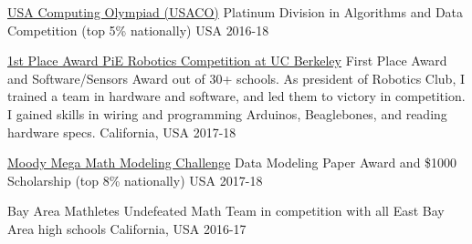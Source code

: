 



\begin{cvhonors}
  
  \cvhonor
		{\href{usaco.org}{USA Computing Olympiad (USACO)}} %
    {Platinum Division in Algorithms and Data Competition (top 5\% nationally)}
    {USA} %
    {2016-18} %
    
  \cvhonor
	{\href{https://pioneers.berkeley.edu/}{1st Place Award PiE Robotics Competition at UC Berkeley}}  %
    {First Place Award and Software/Sensors Award out of 30+ schools. As president of Robotics Club, I trained a team in hardware and software, and led them to victory in competition. I gained skills in wiring and programming Arduinos, Beaglebones, and reading hardware specs.}
    {California, USA} %
    {2017-18} %

  \cvhonor
		{\href{https://m3challenge.siam.org/}{Moody Mega Math Modeling Challenge}} %
    {Data Modeling Paper Award and \$1000 Scholarship (top 8\% nationally)}
    {USA} %
    {2017-18} %
 
  \cvhonor
    {Bay Area Mathletes} %
    {Undefeated Math Team in competition with all East Bay Area high schools}
    {California, USA} %
    {2016-17} %

      
\end{cvhonors}
